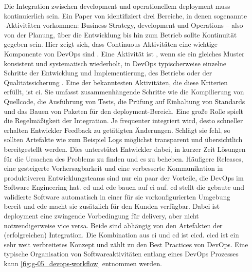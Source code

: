 Die Integration zwischen \Gls{development} und operationellem \Gls{deployment} muss kontinuierlich sein. Ein Paper von \citeauthor{005:Continous-Software-Engineering-and-Beyond} identifiziert drei Bereiche, in denen sogenannte -Aktivitäten vorkommen: Business Strategy, \Gls{development} und Operations -- also von der Planung, über die Entwicklung bis hin zum Betrieb sollte Kontinuität gegeben sein. \cite{005:Continous-Software-Engineering-and-Beyond} Hier zeigt sich, dass Continuous-Aktivitäten eine wichtige Komponente von DevOps sind \cite{000:CI-CD-Deployment-in-DevOps-reduce-Gap-Developer-Operation}. Eine Aktivität ist , wenn sie ein gleiches Muster konsistent und systematisch wiederholt, in DevOps typischerweise einzelne Schritte der Entwicklung und Implementierung, des Betriebs oder der Qualitätssicherung \cite{007:Analysis-of-Declarative-and-Pull-based-Deployment-Models-on-GitOps}. Eine der bekanntesten Aktivitäten, die diese Kriterien erfüllt, ist \acrfull{ci}. Sie umfasst zusammenhängende Schritte wie die Kompilierung von Quellcode, die Ausführung von Tests, die Prüfung auf Einhaltung von Standards und das Bauen von Paketen für den \Gls{deployment}-Bereich. Eine große Rolle spielt die Regelmäßigkeit der Integration. Je frequenter integriert wird, desto schneller erhalten Entwickler Feedback zu getätigten Änderungen. Schlägt sie fehl, so sollten Artefakte wie zum Beispiel Logs möglichst transparent und übersichtlich bereitgestellt werden. Dies unterstützt Entwickler dabei, in kurzer Zeit Lösungen für die Ursachen des Problems zu finden und es zu beheben. Häufigere Releases, eine gesteigerte Vorhersagbarkeit und eine verbesserte Kommunikation in produktiveren Entwicklungsteams sind nur ein paar der Vorteile, die DevOps im Software Engineering hat. \acrfull{cd} und \acrfull{cde} bauen auf \Gls{ci} auf. \acrshort{cd} stellt die gebaute und validierte Software automatisch in einer für sie vorkonfigurierten Umgebung bereit und \acrshort{cde} macht sie zusätzlich für den Kunden verfügbar. Dabei ist \Gls{deployment} eine zwingende Vorbedingung für \Gls{delivery}, aber nicht notwendigerweise vice versa. Beide sind abhängig von den Artefakten der (erfolgreichen) Integration. \cite{005:Continous-Software-Engineering-and-Beyond} Die Kombination aus \Gls{ci} und \Gls{cd} ist \acrfull{cicd}. \Gls{cicd} ist ein sehr weit verbreitetes Konzept und zählt zu den Best Practices von DevOps. Eine typische Organisation von Softwareaktivitäten entlang eines DevOps Prozesses kann \autoref{fig:g-05_devops-workflow} entnommen werden.

